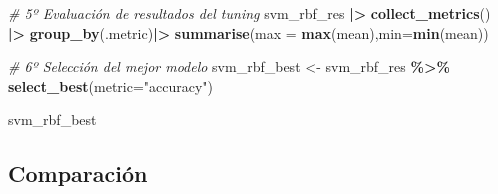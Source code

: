 \documentclass[12pt,a4paper,]{book}
\newenvironment{Shaded}{\begin{snugshade}}{\end{snugshade}}
\newcommand{\AttributeTok}[1]{\textcolor[rgb]{0.13,0.29,0.53}{#1}}
\newcommand{\CommentTok}[1]{\textcolor[rgb]{0.56,0.35,0.01}{\textit{#1}}}
\newcommand{\FunctionTok}[1]{\textcolor[rgb]{0.13,0.29,0.53}{\textbf{#1}}}
\newcommand{\NormalTok}[1]{#1}
\newcommand{\OtherTok}[1]{\textcolor[rgb]{0.56,0.35,0.01}{#1}}
\newcommand{\SpecialCharTok}[1]{\textcolor[rgb]{0.81,0.36,0.00}{\textbf{#1}}}
\newcommand{\StringTok}[1]{\textcolor[rgb]{0.31,0.60,0.02}{#1}}
\numberwithin{dummy}{section}
\theoremstyle{ocrenumbox}
\theoremstyle{blacknumex}
\theoremstyle{blacknumbox}
\theoremstyle{ocrenum}
\theoremstyle{ocrenum}
\begin{document}
\begin{Shaded}
\begin{Highlighting}[]
\CommentTok{\# 5º Evaluación de resultados del tuning}
\NormalTok{svm\_rbf\_res }\SpecialCharTok{|\textgreater{}} 
  \FunctionTok{collect\_metrics}\NormalTok{() }\SpecialCharTok{|\textgreater{}} 
  \FunctionTok{group\_by}\NormalTok{(.metric)}\SpecialCharTok{|\textgreater{}} 
  \FunctionTok{summarise}\NormalTok{(}\AttributeTok{max =} \FunctionTok{max}\NormalTok{(mean),}\AttributeTok{min=}\FunctionTok{min}\NormalTok{(mean))}

\CommentTok{\# 6º Selección del mejor modelo}
\NormalTok{svm\_rbf\_best }\OtherTok{\textless{}{-}} 
\NormalTok{  svm\_rbf\_res }\SpecialCharTok{\%\textgreater{}\%} 
  \FunctionTok{select\_best}\NormalTok{(}\AttributeTok{metric=}\StringTok{"accuracy"}\NormalTok{)}

\NormalTok{svm\_rbf\_best}
\end{Highlighting}
\end{Shaded}

\hypertarget{comparaciuxf3n}{%
\subsection{Comparación}\label{comparaciuxf3n}}
\end{document}
